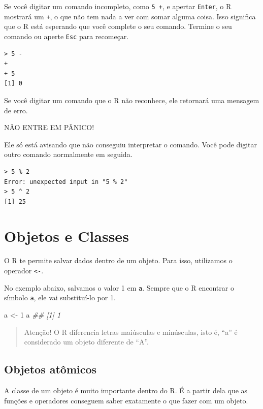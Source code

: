 \documentclass[]{book}
\newenvironment{Shaded}{\begin{snugshade}}{\end{snugshade}}
\newcommand{\CommentTok}[1]{\textcolor[rgb]{0.56,0.35,0.01}{\textit{#1}}}
\newcommand{\DecValTok}[1]{\textcolor[rgb]{0.00,0.00,0.81}{#1}}
\newcommand{\NormalTok}[1]{#1}
\newcommand{\StringTok}[1]{\textcolor[rgb]{0.31,0.60,0.02}{#1}}
\begin{document}
Se você digitar um comando incompleto, como \texttt{5\ +}, e apertar \texttt{Enter}, o R mostrará um \texttt{+}, o que não tem nada a ver com somar alguma coisa. Isso significa que o R está esperando que você complete o seu comando. Termine o seu comando ou aperte \texttt{Esc} para recomeçar.

\begin{verbatim}
> 5 -
+ 
+ 5
[1] 0
\end{verbatim}

Se você digitar um comando que o R não reconhece, ele retornará uma mensagem de erro.

NÃO ENTRE EM PÂNICO!

Ele só está avisando que não conseguiu interpretar o comando. Você pode digitar outro comando normalmente em seguida.

\begin{verbatim}
> 5 % 2
Error: unexpected input in "5 % 2"
> 5 ^ 2
[1] 25
\end{verbatim}

\hypertarget{objetos-e-classes}{%
\section{Objetos e Classes}\label{objetos-e-classes}}

O R te permite salvar dados dentro de um objeto. Para isso, utilizamos o operador \texttt{\textless{}-}.

No exemplo abaixo, salvamos o valor 1 em \texttt{a}. Sempre que o R encontrar o símbolo \texttt{a}, ele vai substituí-lo por 1.

\begin{Shaded}
\begin{Highlighting}[]
\NormalTok{a <-}\StringTok{ }\DecValTok{1}
\NormalTok{a}
\CommentTok{## [1] 1}
\end{Highlighting}
\end{Shaded}

\begin{quote}
Atenção! O R diferencia letras maiúsculas e minúsculas, isto é, ``a'' é considerado um objeto diferente de ``A''.
\end{quote}

\hypertarget{objetos-atuxf4micos}{%
\subsection{Objetos atômicos}\label{objetos-atuxf4micos}}

A classe de um objeto é muito importante dentro do R. É a partir dela que as funções e operadores conseguem saber exatamente o que fazer com um objeto.
\end{document}

